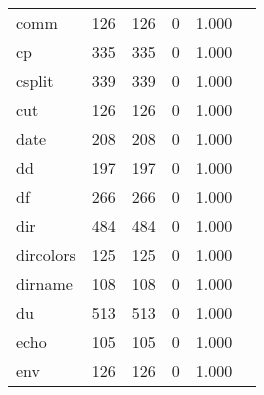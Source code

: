 \begin{longtable}{lp{2.4cm}p{2.4cm}p{2.4cm}p{2.4cm}p{2.4cm}}
comm      &                                    126 &                             126 &                                0 &                                       1.000 \\
cp        &                                    335 &                             335 &                                0 &                                       1.000 \\
csplit    &                                    339 &                             339 &                                0 &                                       1.000 \\
cut       &                                    126 &                             126 &                                0 &                                       1.000 \\
date      &                                    208 &                             208 &                                0 &                                       1.000 \\
dd        &                                    197 &                             197 &                                0 &                                       1.000 \\
df        &                                    266 &                             266 &                                0 &                                       1.000 \\
dir       &                                    484 &                             484 &                                0 &                                       1.000 \\
dircolors &                                    125 &                             125 &                                0 &                                       1.000 \\
dirname   &                                    108 &                             108 &                                0 &                                       1.000 \\
du        &                                    513 &                             513 &                                0 &                                       1.000 \\
echo      &                                    105 &                             105 &                                0 &                                       1.000 \\
env       &                                    126 &                             126 &                                0 &                                       1.000 \\

\end{longtable}
